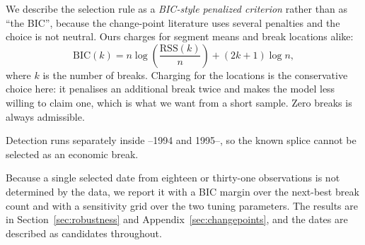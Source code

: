 We describe the selection rule as a \emph{BIC-style penalized criterion} rather than
as ``the BIC'', because the change-point literature uses several penalties and the
choice is not neutral. Ours charges for segment means and break locations alike:
\[
\mathrm{BIC}(k) = n \log\!\left(\frac{\mathrm{RSS}(k)}{n}\right) + (2k+1)\log n,
\]
where $k$ is the number of breaks. Charging for the locations is the conservative
choice here: it penalises an additional break twice and makes the model less willing
to claim one, which is what we want from a short sample. Zero breaks is always
admissible.

Detection runs separately inside \PanelStart--1994 and 1995--\PanelEnd, so the known
splice cannot be selected as an economic break.

Because a single selected date from eighteen or thirty-one observations is not
determined by the data, we report it with a BIC margin over the next-best break
count and with a sensitivity grid over the two tuning parameters. The results are
in Section~\ref{sec:robustness} and Appendix~\ref{sec:changepoints}, and the dates
are described as candidates throughout.
